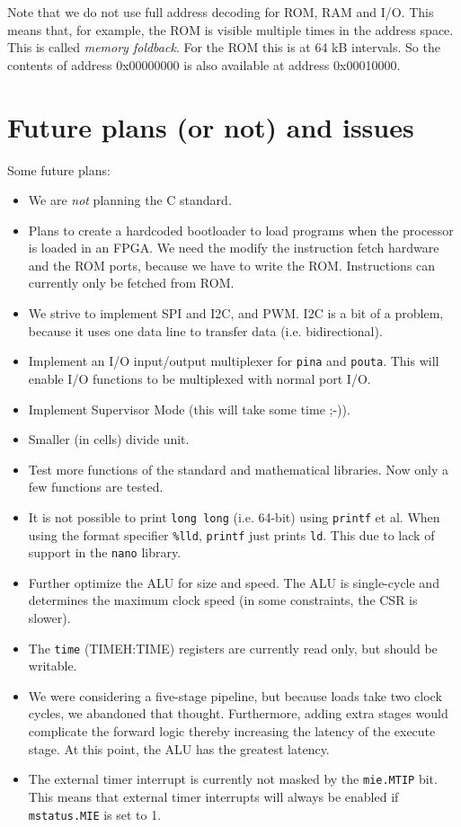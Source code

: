 \documentclass[12pt]{article}
\begin{document}
Note that we do not use full address decoding for ROM, RAM and I/O. This means that, for example, the ROM is visible multiple times in the address space. This is called \emph{memory foldback}. For the ROM this is at 64 kB intervals. So the contents of address 0x00000000 is also available at address 0x00010000.

\section{Future plans (or not) and issues}
Some future plans:

\begin{itemize}
\item We are \emph{not} planning the C standard.
\item Plans to create a hardcoded bootloader to load programs when the processor is loaded in an FPGA. We need the modify the instruction fetch hardware and the ROM ports, because we have to write the ROM. Instructions can currently only be fetched from ROM.
\item We strive to implement SPI and I2C, and PWM. I2C is a bit of a problem, because it uses one data line to transfer data (i.e. bidirectional).
\item Implement an I/O input/output multiplexer for \texttt{pina} and \texttt{pouta}. This will enable I/O functions to be multiplexed with normal port I/O.
\item Implement Supervisor Mode (this will take some time ;-)).
\item Smaller (in cells) divide unit.
\item Test more functions of the standard and mathematical libraries. Now only a few functions are tested.
\item It is not possible to print \texttt{long long} (i.e. 64-bit) using \texttt{printf} et al. When using the format specifier \texttt{\%lld}, \texttt{printf} just prints \texttt{ld}. This due to lack of support in the \texttt{nano} library.
\item Further optimize the ALU for size and speed. The ALU is single-cycle and determines the maximum clock speed (in some constraints, the CSR is slower).
\item The \texttt{time} (TIMEH:TIME) registers are currently read only, but should be writable.
\item We were considering a five-stage pipeline, but because loads take two clock cycles, we abandoned that thought. Furthermore, adding extra stages would complicate the forward logic thereby increasing the latency of the execute stage. At this point, the ALU has the greatest latency.
\item The external timer interrupt is currently not masked by the \texttt{mie.MTIP} bit. This means that external timer interrupts will always be enabled if \texttt{mstatus.MIE} is set to 1.
\end{itemize}
\end{document}
